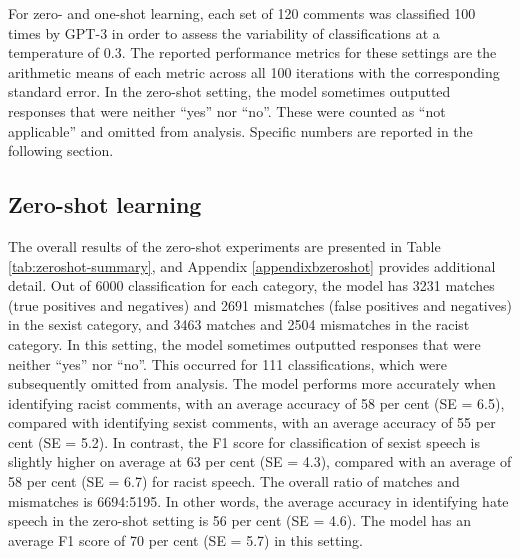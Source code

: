 \documentclass[12pt,]{article}
\begin{document}
For zero- and one-shot learning, each set of 120 comments was classified 100 times by GPT-3 in order to assess the variability of classifications at a temperature of 0.3. The reported performance metrics for these settings are the arithmetic means of each metric across all 100 iterations with the corresponding standard error. In the zero-shot setting, the model sometimes outputted responses that were neither ``yes'' nor ``no''. These were counted as ``not applicable'' and omitted from analysis. Specific numbers are reported in the following section.

\hypertarget{zero-shot-learning-1}{%
\subsection{Zero-shot learning}\label{zero-shot-learning-1}}

The overall results of the zero-shot experiments are presented in Table \ref{tab:zeroshot-summary}, and Appendix \ref{appendixbzeroshot} provides additional detail. Out of 6000 classification for each category, the model has 3231 matches (true positives and negatives) and 2691 mismatches (false positives and negatives) in the sexist category, and 3463 matches and 2504 mismatches in the racist category. In this setting, the model sometimes outputted responses that were neither ``yes'' nor ``no''. This occurred for 111 classifications, which were subsequently omitted from analysis. The model performs more accurately when identifying racist comments, with an average accuracy of 58 per cent (SE = 6.5), compared with identifying sexist comments, with an average accuracy of 55 per cent (SE = 5.2). In contrast, the F1 score for classification of sexist speech is slightly higher on average at 63 per cent (SE = 4.3), compared with an average of 58 per cent (SE = 6.7) for racist speech. The overall ratio of matches and mismatches is 6694:5195. In other words, the average accuracy in identifying hate speech in the zero-shot setting is 56 per cent (SE = 4.6). The model has an average F1 score of 70 per cent (SE = 5.7) in this setting.
\end{document}
